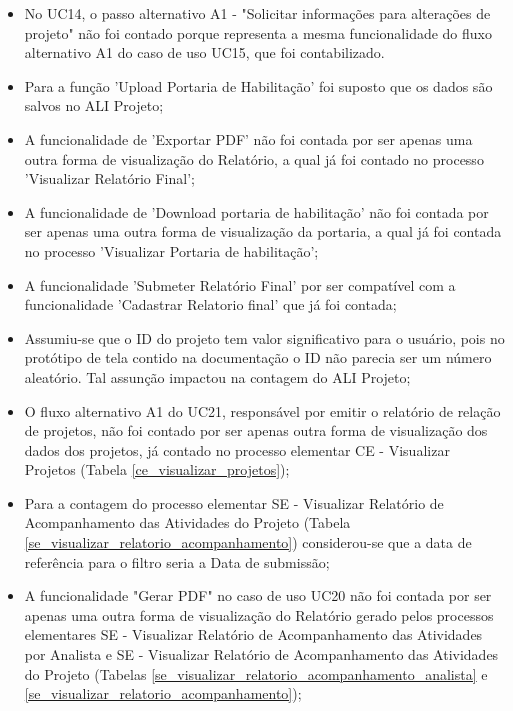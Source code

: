   \begin{itemize}
  
   \item No UC14, o passo alternativo A1 - "Solicitar informações para alterações de projeto" não foi contado porque representa a mesma funcionalidade
     do fluxo alternativo A1 do caso de uso UC15, que foi contabilizado.
   
   \item Para a função 'Upload Portaria de Habilitação' foi suposto que os dados são salvos no ALI Projeto;
   
   \item A funcionalidade de 'Exportar PDF' não foi contada por ser apenas uma outra forma de visualização do Relatório, a qual já foi contado
   no processo 'Visualizar Relatório Final';
   
   \item A funcionalidade de 'Download portaria de habilitação' não foi contada por ser apenas uma outra forma de visualização da portaria, a qual
   já foi contada no processo 'Visualizar Portaria de habilitação';
   
   \item A funcionalidade 'Submeter Relatório Final' por ser compatível com a funcionalidade 'Cadastrar Relatorio final'
   que já foi contada;
   
   \item Assumiu-se que o ID do projeto tem valor significativo para o usuário, pois no protótipo de tela contido na documentação o ID não 
    parecia ser um número aleatório. Tal assunção impactou na contagem do ALI Projeto;
   
   \item O fluxo alternativo A1 do UC21, responsável por emitir o relatório de relação de projetos, não foi contado por ser apenas outra forma
    de visualização dos dados dos projetos, já contado no processo elementar CE - Visualizar Projetos (Tabela \ref{ce_visualizar_projetos});
   
   \item Para a contagem do processo elementar SE - Visualizar Relatório de Acompanhamento das Atividades do Projeto
    (Tabela \ref{se_visualizar_relatorio_acompanhamento}) considerou-se que a data de referência para o filtro seria a Data de submissão;
    
   \item A funcionalidade "Gerar PDF" no caso de uso UC20 não foi contada por ser apenas uma outra forma de visualização do Relatório gerado
     pelos processos elementares SE - Visualizar Relatório de Acompanhamento das Atividades por Analista e 
     SE - Visualizar Relatório de Acompanhamento das Atividades do Projeto
     (Tabelas \ref{se_visualizar_relatorio_acompanhamento_analista} e \ref{se_visualizar_relatorio_acompanhamento});
     

\end{itemize}
